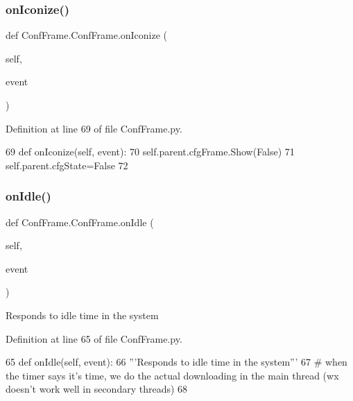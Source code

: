 \subsubsection{\texorpdfstring{on\+Iconize()}{onIconize()}}
{\footnotesize\ttfamily def Conf\+Frame.\+Conf\+Frame.\+on\+Iconize (\begin{DoxyParamCaption}\item[{}]{self,  }\item[{}]{event }\end{DoxyParamCaption})}



Definition at line 69 of file Conf\+Frame.\+py.


\begin{DoxyCode}
69     \textcolor{keyword}{def }onIconize(self, event):
70         self.parent.cfgFrame.Show(\textcolor{keyword}{False})
71         self.parent.cfgState=\textcolor{keyword}{False}
72 
\end{DoxyCode}
\mbox{\label{classConfFrame_1_1ConfFrame_a82cf80e649080f468ad4d4de1a2d6b9a}} 
\subsubsection{\texorpdfstring{on\+Idle()}{onIdle()}}
{\footnotesize\ttfamily def Conf\+Frame.\+Conf\+Frame.\+on\+Idle (\begin{DoxyParamCaption}\item[{}]{self,  }\item[{}]{event }\end{DoxyParamCaption})}

\begin{DoxyVerb}Responds to idle time in the system\end{DoxyVerb}
 

Definition at line 65 of file Conf\+Frame.\+py.


\begin{DoxyCode}
65     \textcolor{keyword}{def }onIdle(self, event):
66         \textcolor{stringliteral}{'''Responds to idle time in the system'''}
67         \textcolor{comment}{# when the timer says it's time, we do the actual downloading in the main thread (wx doesn't work
       well in secondary threads)}
68 
\end{DoxyCode}
\mbox{\label{classConfFrame_1_1ConfFrame_a3d39db586535191174d87bb5aac11a47}} 
